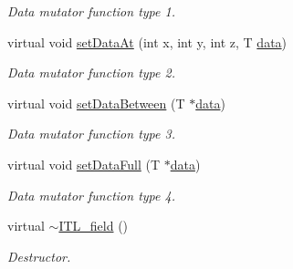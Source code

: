 \begin{DoxyCompactItemize}
\begin{DoxyCompactList}\small\item\em Data mutator function type 1. \item\end{DoxyCompactList}\item 
virtual void \hyperlink{classITL__field_aeea532e25732eb1582a937409a98d05e}{setDataAt} (int x, int y, int z, T \hyperlink{MainIT__regvector_8cpp_a783b2b1c03f80ec0d3ed965238d6bd65}{data})
\begin{DoxyCompactList}\small\item\em Data mutator function type 2. \item\end{DoxyCompactList}\item 
virtual void \hyperlink{classITL__field_a4bbd5103c5298ac87eaac25c759a98c7}{setDataBetween} (T $\ast$\hyperlink{MainIT__regvector_8cpp_a783b2b1c03f80ec0d3ed965238d6bd65}{data})
\begin{DoxyCompactList}\small\item\em Data mutator function type 3. \item\end{DoxyCompactList}\item 
virtual void \hyperlink{classITL__field_a0c32994fe56253d8c7111d670742afc1}{setDataFull} (T $\ast$\hyperlink{MainIT__regvector_8cpp_a783b2b1c03f80ec0d3ed965238d6bd65}{data})
\begin{DoxyCompactList}\small\item\em Data mutator function type 4. \item\end{DoxyCompactList}\item 
virtual \hyperlink{classITL__field_aa8ace26f8abdf8a2d7a94ea27f0e7a16}{$\sim$ITL\_\-field} ()
\begin{DoxyCompactList}\small\item\em Destructor. \item\end{DoxyCompactList}\end{DoxyCompactItemize}
